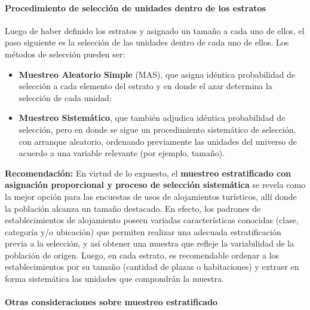 \documentclass[
]{book}
\begin{document}
\hypertarget{procedimiento-de-selecciuxf3n-de-unidades-dentro-de-los-estratos}{%
\paragraph{Procedimiento de selección de unidades dentro de los estratos}\label{procedimiento-de-selecciuxf3n-de-unidades-dentro-de-los-estratos}}

Luego de haber definido los estratos y asignado un tamaño a cada uno de ellos, el paso siguiente es la selección de las unidades dentro de cada uno de ellos. Los métodos de selección pueden ser:

\begin{itemize}
\item
  \textbf{Muestreo Aleatorio Simple} (MAS), que asigna idéntica probabilidad de selección a cada elemento del estrato y en donde el azar determina la selección de cada unidad;
\item
  \textbf{Muestreo Sistemático}, que también adjudica idéntica probabilidad de selección, pero en donde se sigue un procedimiento sistemático de selección, con arranque aleatorio, ordenando previamente las unidades del universo de acuerdo a una variable relevante (por ejemplo, tamaño).
\end{itemize}

\textbf{Recomendación:} En virtud de lo expuesto, el \textbf{muestreo estratificado con asignación proporcional y proceso de selección sistemática} se revela como la mejor opción para las encuestas de usos de alojamientos turísticos, allí donde la población alcanza un tamaño destacado. En efecto, los padrones de establecimientos de alojamiento poseen variadas características conocidas (clase, categoría y/o ubicación) que permiten realizar una adecuada estratificación previa a la selección, y así obtener una muestra que refleje la variabilidad de la población de origen. Luego, en cada estrato, es recomendable ordenar a los establecimientos por su tamaño (cantidad de plazas o habitaciones) y extraer en forma sistemática las unidades que compondrán la muestra.

\hypertarget{otras-consideraciones-sobre-muestreo-estratificado}{%
\paragraph{Otras consideraciones sobre muestreo estratificado}\label{otras-consideraciones-sobre-muestreo-estratificado}}
\end{document}
